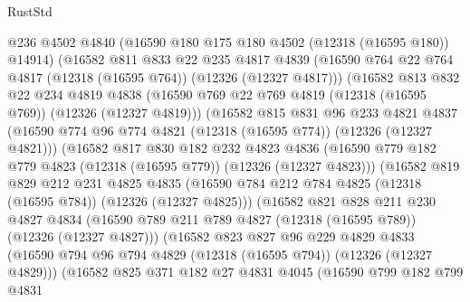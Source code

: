 \begin{lexlean}{RustStd}
\begin{coremodule}
            @236
            @4502
            @4840
            (@16590 @180 @175 @180 @4502 (@12318 (@16595 @180)) @14914)
            (@16582
              @811
              @833
              @22
              @235
              @4817
              @4839
              (@16590 @764 @22 @764 @4817 (@12318 (@16595 @764)) (@12326 (@12327 @4817)))
              (@16582
                @813
                @832
                @22
                @234
                @4819
                @4838
                (@16590 @769 @22 @769 @4819 (@12318 (@16595 @769)) (@12326 (@12327 @4819)))
                (@16582
                  @815
                  @831
                  @96
                  @233
                  @4821
                  @4837
                  (@16590 @774 @96 @774 @4821 (@12318 (@16595 @774)) (@12326 (@12327 @4821)))
                  (@16582
                    @817
                    @830
                    @182
                    @232
                    @4823
                    @4836
                    (@16590 @779 @182 @779 @4823 (@12318 (@16595 @779)) (@12326 (@12327 @4823)))
                    (@16582
                      @819
                      @829
                      @212
                      @231
                      @4825
                      @4835
                      (@16590 @784 @212 @784 @4825 (@12318 (@16595 @784)) (@12326 (@12327 @4825)))
                      (@16582
                        @821
                        @828
                        @211
                        @230
                        @4827
                        @4834
                        (@16590 @789 @211 @789 @4827 (@12318 (@16595 @789)) (@12326 (@12327 @4827)))
                        (@16582
                          @823
                          @827
                          @96
                          @229
                          @4829
                          @4833
                          (@16590
                            @794
                            @96
                            @794
                            @4829
                            (@12318 (@16595 @794))
                            (@12326 (@12327 @4829)))
                          (@16582
                            @825
                            @371
                            @182
                            @27
                            @4831
                            @4045
                            (@16590
                              @799
                              @182
                              @799
                              @4831

\end{coremodule}
\end{lexlean}
